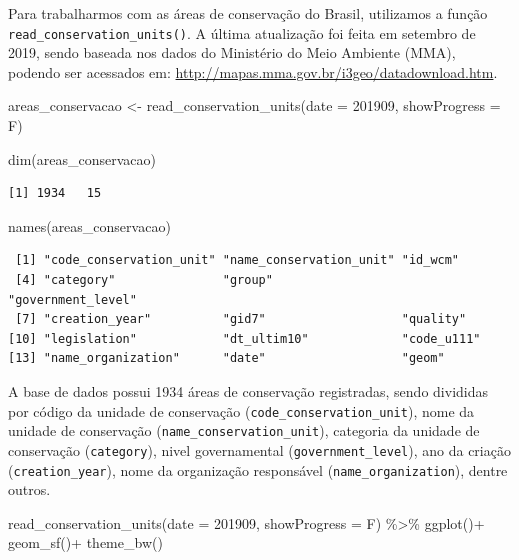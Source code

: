 \documentclass[
  brazilian,
]{book}
\newenvironment{Shaded}{\begin{snugshade}}{\end{snugshade}}
\newcommand{\AttributeTok}[1]{\textcolor[rgb]{0.77,0.63,0.00}{#1}}
\newcommand{\DecValTok}[1]{\textcolor[rgb]{0.00,0.00,0.81}{#1}}
\newcommand{\FunctionTok}[1]{\textcolor[rgb]{0.00,0.00,0.00}{#1}}
\newcommand{\NormalTok}[1]{#1}
\newcommand{\OtherTok}[1]{\textcolor[rgb]{0.56,0.35,0.01}{#1}}
\newcommand{\SpecialCharTok}[1]{\textcolor[rgb]{0.00,0.00,0.00}{#1}}
\begin{document}
Para trabalharmos com as áreas de conservação do Brasil, utilizamos a função \texttt{read\_conservation\_units()}. A última atualização foi feita em setembro de 2019, sendo baseada nos dados do Ministério do Meio Ambiente (MMA), podendo ser acessados em: \url{http://mapas.mma.gov.br/i3geo/datadownload.htm}.

\begin{Shaded}
\begin{Highlighting}[]
\NormalTok{areas\_conservacao }\OtherTok{\textless{}{-}} \FunctionTok{read\_conservation\_units}\NormalTok{(}\AttributeTok{date =} \DecValTok{201909}\NormalTok{,}
                                             \AttributeTok{showProgress =}\NormalTok{ F)}

\FunctionTok{dim}\NormalTok{(areas\_conservacao)}
\end{Highlighting}
\end{Shaded}

\begin{verbatim}
[1] 1934   15
\end{verbatim}

\begin{Shaded}
\begin{Highlighting}[]
\FunctionTok{names}\NormalTok{(areas\_conservacao)}
\end{Highlighting}
\end{Shaded}

\begin{verbatim}
 [1] "code_conservation_unit" "name_conservation_unit" "id_wcm"                
 [4] "category"               "group"                  "government_level"      
 [7] "creation_year"          "gid7"                   "quality"               
[10] "legislation"            "dt_ultim10"             "code_u111"             
[13] "name_organization"      "date"                   "geom"                  
\end{verbatim}

A base de dados possui 1934 áreas de conservação registradas, sendo divididas por código da unidade de conservação (\texttt{code\_conservation\_unit}), nome da unidade de conservação (\texttt{name\_conservation\_unit}), categoria da unidade de conservação (\texttt{category}), nivel governamental (\texttt{government\_level}), ano da criação (\texttt{creation\_year}), nome da organização responsável (\texttt{name\_organization}), dentre outros.

\begin{Shaded}
\begin{Highlighting}[]
\FunctionTok{read\_conservation\_units}\NormalTok{(}\AttributeTok{date =} \DecValTok{201909}\NormalTok{,}
                        \AttributeTok{showProgress =}\NormalTok{ F) }\SpecialCharTok{\%\textgreater{}\%} 
  \FunctionTok{ggplot}\NormalTok{()}\SpecialCharTok{+}
  \FunctionTok{geom\_sf}\NormalTok{()}\SpecialCharTok{+}
  \FunctionTok{theme\_bw}\NormalTok{()}
\end{Highlighting}
\end{Shaded}
\end{document}
